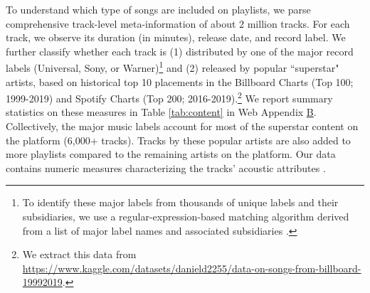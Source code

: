 To understand which type of songs are included on playlists, we parse comprehensive track-level meta-information of about $2$ million tracks.
For each track, we observe its duration (in minutes), release date, and record label.
We further classify whether each track is (1) distributed by one of the major record labels (Universal, Sony, or Warner)\footnote{%
To identify these major labels from thousands of unique labels and their subsidiaries, we use a regular-expression-based matching algorithm derived from a list of major label names and associated subsidiaries \citep[as in, e.g.,][]{boughanmiacoustics}.%
} 
and (2) released by popular ``superstar" artists, based on historical top 10 placements in the Billboard Charts (Top 100; 1999-2019) and Spotify Charts (Top 200; 2016-2019).\footnote{We extract this data from \url{https://www.kaggle.com/datasets/danield2255/data-on-songs-from-billboard-19992019}.} We report summary statistics on these measures in Table \ref{tab:content} in Web Appendix \hyperref[summary_final_sample]{B}. Collectively, the major music labels account for most of
the superstar content on the platform (6,000+ tracks). Tracks by these popular artists
are also added to more playlists compared to the remaining artists on the platform. Our data contains numeric measures characterizing the tracks' acoustic attributes \citep[as in][i.e., danceability, energy, speechiness, acousticness, instrumentalness, liveness, valence, tempo, loudness]{boughanmiacoustics}.
